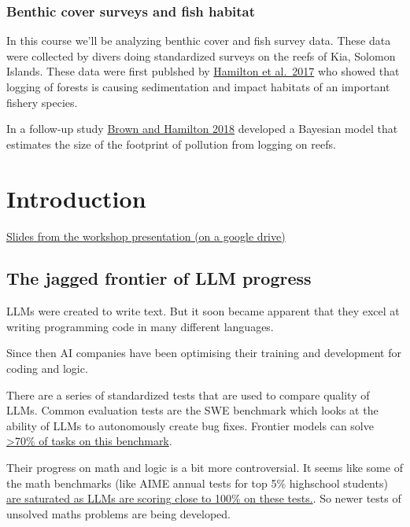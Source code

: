 \documentclass[
  letterpaper,
  DIV=11,
  numbers=noendperiod]{scrreprt}
\begin{document}
\subsection{Benthic cover surveys and fish
habitat}\label{benthic-cover-surveys-and-fish-habitat}

In this course we'll be analyzing benthic cover and fish survey data.
These data were collected by divers doing standardized surveys on the
reefs of Kia, Solomon Islands. These data were first publshed by
\href{http://dx.doi.org/10.1016/j.biocon.2017.04.024}{Hamilton et
al.~2017} who showed that logging of forests is causing sedimentation
and impact habitats of an important fishery species.

In a follow-up study \href{http://dx.doi.org/10.1111/cobi.13079}{Brown
and Hamilton 2018} developed a Bayesian model that estimates the size of
the footprint of pollution from logging on reefs.


\chapter{Introduction}\label{introduction}

\href{https://docs.google.com/presentation/d/1BYfAjU4NPaIQ9CNSRlIVZJpJGof3moS9/edit?usp=drive_link&ouid=107596646496267980935&rtpof=true&sd=true}{Slides
from the workshop presentation (on a google drive)}

\section{The jagged frontier of LLM
progress}\label{the-jagged-frontier-of-llm-progress}

LLMs were created to write text. But it soon became apparent that they
excel at writing programming code in many different languages.

Since then AI companies have been optimising their training and
development for coding and logic.

There are a series of standardized tests that are used to compare
quality of LLMs. Common evaluation tests are the SWE benchmark which
looks at the ability of LLMs to autonomously create bug fixes. Frontier
models can solve \href{https://www.swebench.com/}{\textgreater70\% of
tasks on this benchmark}.

Their progress on math and logic is a bit more controversial. It seems
like some of the math benchmarks (like AIME annual tests for top 5\%
highschool students)
\href{https://epoch.ai/frontiermath/the-benchmark}{are saturated as LLMs
are scoring close to 100\% on these tests.}. So newer tests of unsolved
maths problems are being developed.
\end{document}
